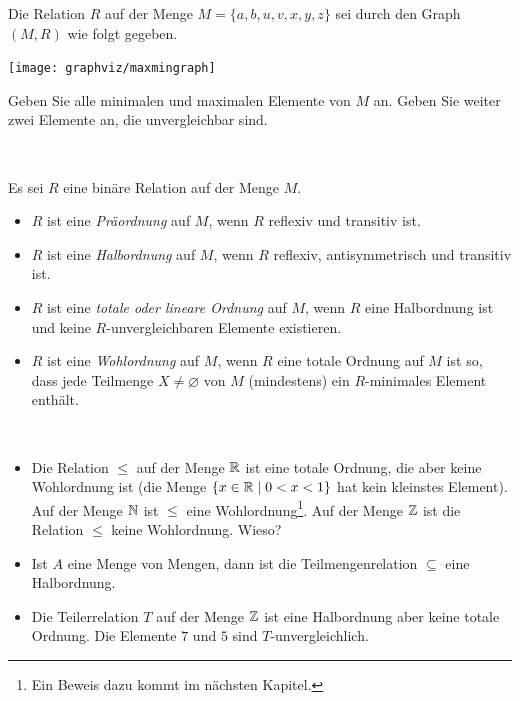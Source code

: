     \begin{ueb}
    Die Relation $R$ auf der Menge $M=\{a,b,u,v,x,y,z\}$ sei durch den Graph $(M,R)$ wie folgt
    gegeben.
    \begin{center}
    \texttt{[image: graphviz/maxmingraph]}
    \end{center}
    Geben Sie alle minimalen und maximalen Elemente von $M$ an. Geben Sie weiter zwei Elemente an, die unvergleichbar sind.
    \end{ueb}
    \begin{lsg}~
    \end{lsg}

    \begin{df}
    Es sei $R$ eine binäre Relation auf der Menge $M$.
    \begin{itemize}
    \item $R$ ist eine \textit{Präordnung} auf $M$, wenn $R$ reflexiv und transitiv ist.
    \item $R$ ist eine \textit{Halbordnung} auf $M$, wenn $R$ reflexiv, antisymmetrisch und transitiv ist.
    \item $R$ ist eine \textit{totale oder lineare Ordnung} auf $M$, wenn $R$ eine Halbordnung ist und keine $R$-unvergleichbaren Elemente existieren.
    \item $R$ ist eine \textit{Wohlordnung} auf $M$, wenn $R$ eine totale Ordnung auf $M$ ist so, dass jede Teilmenge $X\neq\varnothing$ von $M$ (mindestens) ein $R$-minimales Element enthält.
    \end{itemize}
    \end{df}


    \begin{bsp}~
    \begin{itemize}
    \item Die Relation $\leq$ auf der Menge $\mathbb{R}$ ist eine totale Ordnung, die aber keine Wohlordnung ist (die Menge $\{x\in\mathbb{R}\mid 0<x<1\}$ hat kein kleinstes Element). Auf der Menge $\mathbb{N}$ ist $\leq$ eine Wohlordnung\footnote{Ein Beweis dazu kommt im nächsten Kapitel.}. Auf der Menge $\mathbb{Z}$ ist die Relation $\leq$ keine Wohlordnung. Wieso?
    \item Ist $A$ eine Menge von Mengen, dann ist die Teilmengenrelation $\subseteq$ eine Halbordnung.
    \item Die Teilerrelation $T$ auf der Menge $\mathbb{Z}$ ist eine Halbordnung aber keine totale Ordnung. Die Elemente $7$ und $5$ sind $T$-unvergleichlich.
    \end{itemize}
    \end{bsp}

